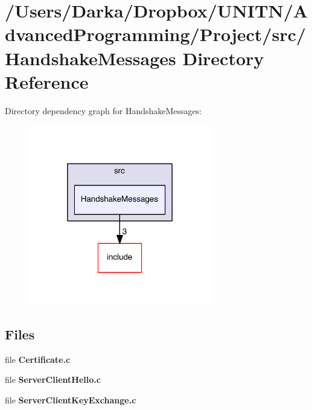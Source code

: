 \section{/\+Users/\+Darka/\+Dropbox/\+U\+N\+I\+T\+N/\+Advanced\+Programming/\+Project/src/\+Handshake\+Messages Directory Reference}
\label{dir_725be1482c67889780630c551fb707e9}
Directory dependency graph for Handshake\+Messages\+:\nopagebreak
\begin{figure}[H]
\begin{center}
\leavevmode
\includegraphics[width=226pt]{dir_725be1482c67889780630c551fb707e9_dep}
\end{center}
\end{figure}
\subsection*{Files}
\begin{DoxyCompactItemize}
\item 
file {\bf Certificate.\+c}
\item 
file {\bf Server\+Client\+Hello.\+c}
\item 
file {\bf Server\+Client\+Key\+Exchange.\+c}
\end{DoxyCompactItemize}
